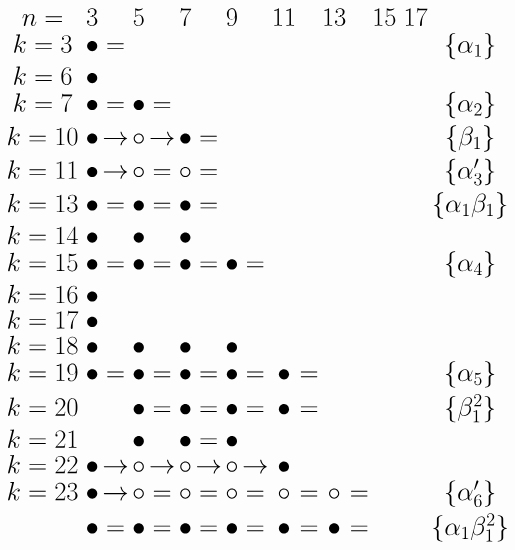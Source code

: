 \documentclass{article}
\begin{document}
\(
\begin{tikzcd}[nodes={font=\huge,inner sep=0pt},row sep=0.2cm,column sep=0.1cm]
n= & & 3 & & 5 & & 7 & & 9 & & 11 & & 13 & & 15 & & 17 &  \\
k=3 && \bullet & = && && && && && && && \{\alpha_1\} \\
k=6 && \bullet \\
k=7 && \bullet & = & \bullet & = && && && && && && \{\alpha_2\} \\
k=10 && \bullet & \rightarrow & \circ & \rightarrow & \bullet & = && && && && && \{\beta_1\} \\
k=11 && \bullet & \rightarrow & \circ & = & \circ & = && && && && && \{\alpha'_3\} \\
k=13 && \bullet & = & \bullet &=& \bullet &=&& && && && && \{\alpha_1\beta_1\} \\
k=14 && \bullet && \bullet && \bullet \\
k=15 && \bullet &=& \bullet &=& \bullet &=& \bullet &= && && && && \{\alpha_4\} \\
k=16 && \bullet \\
k=17 && \bullet \\
k=18 && \bullet && \bullet && \bullet && \bullet \\
k=19 && \bullet &=& \bullet &=& \bullet &=& \bullet &=& \bullet &=&& && && \{\alpha_5\} \\
k=20 && && \bullet &=& \bullet &=& \bullet &=& \bullet &=&& && && \{\beta_1^2\} \\
k=21 && && \bullet && \bullet &=& \bullet \\
k=22 && \bullet & \rightarrow & \circ & \rightarrow & \circ & \rightarrow & \circ & \rightarrow & \bullet \\
k=23 && \bullet & \rightarrow & \circ & = & \circ & = & \circ & = & \circ & = & \circ & = && && \{\alpha'_6\} \\
 && \bullet &=& \bullet &=& \bullet &=& \bullet &=& \bullet &=& \bullet & = && && \{\alpha_1\beta_1^2\} \\
\end{tikzcd}
\)
\end{document}
